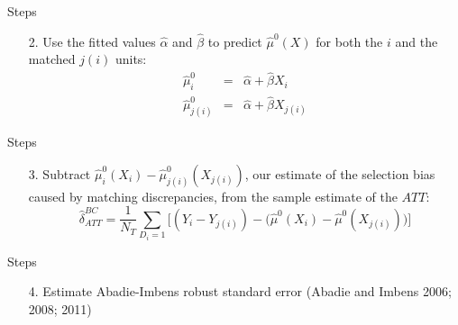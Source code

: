 \documentclass{beamer}
\begin{document}
\begin{frame}{Steps}

\begin{enumerate}
\item[2. ] Use the fitted values $\widehat{\alpha}$ and $\widehat{\beta}$ to predict $\widehat{\mu}^0(X)$ for both the $i$ and the matched $j(i)$ units:
\begin{eqnarray}
\widehat{\mu}^0_i &=& \widehat{\alpha} + \widehat{\beta} X_i \nonumber \\
\widehat{\mu}^0_{j(i)} &=& \widehat{\alpha} + \widehat{\beta} X_{j(i)} \nonumber
\end{eqnarray}
\end{enumerate}

\end{frame}


\begin{frame}{Steps}

\begin{enumerate}
\item[3. ] Subtract $ \widehat{\mu}_i^0(X_i) - \widehat{\mu}_{j(i)}^0(X_{j(i)})$, our estimate of the selection bias caused by matching discrepancies, from the sample estimate of the $ATT$: $$\widehat{\delta}_{ATT}^{BC} = \dfrac{1}{N_T} \sum_{D_i=1} \bigg [ (Y_i - Y_{j(i)}) - \Big(\widehat{\mu}^0(X_i) - \widehat{\mu}^0(X_{j(i)})\Big) \bigg ]$$
\end{enumerate}

\end{frame}


\begin{frame}{Steps}

\begin{enumerate}
\item[4. ] Estimate Abadie-Imbens robust standard error (Abadie and Imbens 2006; 2008; 2011)
\end{enumerate}

\end{frame}
\end{document}
